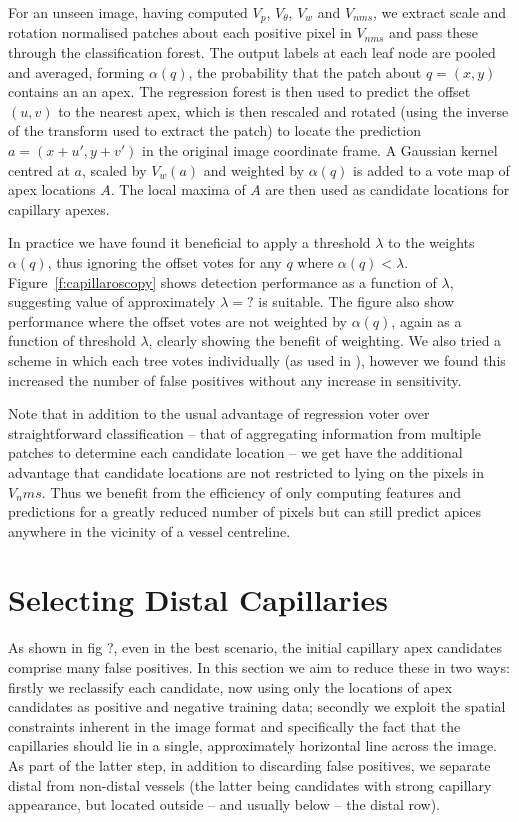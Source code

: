 \documentclass[runningheads,a4paper]{llncs}
\newcommand{\fref}[1]{Figure~\ref{#1}}
\begin{document}
For an unseen image, having computed $V_p$, $V_\theta$, $V_w$ and $V_{nms}$, we extract scale and rotation normalised patches about each positive pixel in $V_{nms}$ and pass these through the classification forest. The output labels at each leaf node are pooled and averaged, forming $\alpha(q)$, the probability that the patch about $q=(x,y)$ contains an an apex. The regression forest is then used to predict the offset $(u,v)$ to the nearest apex, which is then rescaled and rotated (using the inverse of the transform used to extract the patch) to locate the prediction $a = (x+u',y+v')$ in the original image coordinate frame. A Gaussian kernel centred at $a$, scaled by $V_w(a)$ and weighted by $\alpha(q)$ is added to a vote map of apex locations $A$. The local maxima of $A$ are then used as candidate locations for capillary apexes.

In practice we have found it beneficial to apply a threshold $\lambda$ to the weights $\alpha(q)$, thus ignoring the offset votes for any $q$ where $\alpha(q) < \lambda$. \fref{f:capillaroscopy} shows detection performance as a function of $\lambda$, suggesting value of approximately $\lambda = ?$ is suitable. The figure also show performance where the offset votes are not weighted by $\alpha(q)$, again as a function of threshold $\lambda$, clearly showing the benefit of weighting. We also tried a scheme in which each tree votes individually (as used in \cite{}), however we found this increased the number of false positives without any increase in sensitivity.

Note that in addition to the usual advantage of regression voter over straightforward classification -- that of aggregating information from multiple patches to determine each candidate location -- we get have the additional advantage that candidate locations are not restricted to lying on the pixels in $V_nms$. Thus we benefit from the efficiency of only computing features and predictions for a greatly reduced number of pixels but can still predict apices anywhere in the vicinity of a vessel centreline.

\section{Selecting Distal Capillaries}
\label{s:distal_row}
As shown in fig ?, even in the best scenario, the initial capillary apex candidates comprise many false positives. In this section we aim to reduce these in two ways: firstly we reclassify each candidate, now using only the locations of apex candidates as positive and negative training data; secondly we exploit the spatial constraints inherent in the image format and specifically the fact that the capillaries should lie in a single, approximately horizontal line across the image. As part of the latter step, in addition to discarding false positives, we separate distal from non-distal vessels (the latter being candidates with strong capillary appearance, but located outside -- and usually below -- the distal row).
\end{document}
